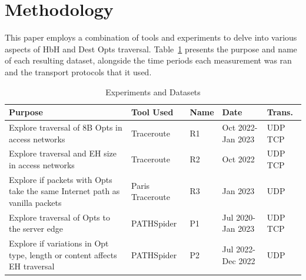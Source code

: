 \documentclass[conference]{IEEEtran}
\begin{document}







\section{Methodology} 
\label{sec:methodology}

This paper employs a combination of tools and experiments to delve into various aspects of HbH and Dest Opts traversal. Table~\ref{tbl:datasets} presents the purpose and name of each resulting dataset, alongside the time periods each measurement was ran and the transport protocols that it used.

\begin{table}[h]
\begin{tabular}{p{}|p{}|p{}|p{}|p{}}
Purpose                                                                          & Tool Used        & Name & Date               & Trans. \\
\hline
Explore traversal of 8B Opts in access networks                                  & Traceroute       & R1           & Oct 2022- Jan 2023 & UDP TCP          \\
\hline
Explore traversal and EH size in access networks                                & Traceroute       & R2           & Oct 2022           & UDP TCP          \\
\hline
Explore if packets with Opts take the same Internet path as vanilla packets & Paris Traceroute & R3           & Jan 2023           & UDP               \\
\hline
Explore traversal of Opts to the server edge                              & PATHSpider       & P1           & Jul 2020- Jan 2023 & UDP TCP          \\
\hline
Explore if variations in Opt type, length or content affects EH traversal   & PATHSpider       & P2           & Jul 2022- Dec 2022     & UDP              
\end{tabular}
  \caption{Experiments and Datasets}
  \label{tbl:datasets}
\end{table}
\end{document}
